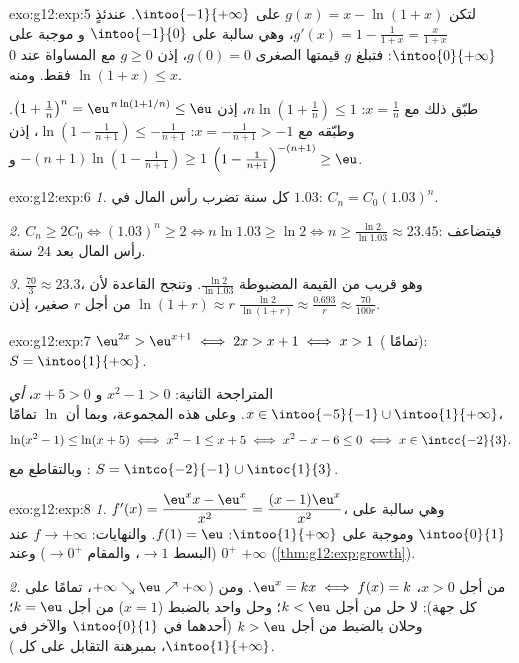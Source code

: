 \begin{solution}{exo:g12:exp:5}
لتكن $g(x) = x - \ln(1+x)$ على $\intoo{-1}{+\infty}$. عندئذٍ
$g'(x) = 1 - \frac{1}{1+x} = \frac{x}{1+x}$، وهي سالبة على $\intoo{-1}{0}$ و
موجبة على $\intoo{0}{+\infty}$: فتبلغ $g$ قيمتها الصغرى $g(0) = 0$، إذن
$g \geq 0$ مع المساواة عند $0$ فقط. ومنه $\ln(1+x) \leq x$.

طبّق ذلك مع $x = \frac1n$:
$n\ln\left(1 + \frac1n\right) \leq 1$، إذن
$\left(1+\frac1n\right)^n = \eu^{\,n\ln(1+1/n)} \leq \eu$.
وطبّقه مع $x = -\frac{1}{n+1} > -1$:
$\ln\left(1 - \frac{1}{n+1}\right) \leq -\frac{1}{n+1}$، إذن
$-(n+1)\ln\left(1 - \frac{1}{n+1}\right) \geq 1$ و
$\left(1 - \frac{1}{n+1}\right)^{-(n+1)} \geq \eu$.
\end{solution}

\begin{solution}{exo:g12:exp:6}
\emph{1.} كل سنة تضرب رأس المال في $1.03$: $C_n = C_0 (1.03)^n$.

\emph{2.} $C_n \geq 2C_0 \iff (1.03)^n \geq 2 \iff n \ln 1.03 \geq \ln 2
\iff n \geq \frac{\ln 2}{\ln 1.03} \approx 23.45$: فيتضاعف رأس المال بعد
$24$ سنة.

\emph{3.} $\frac{70}{3} \approx 23.3$، وهو قريب من القيمة المضبوطة
$\frac{\ln 2}{\ln 1.03}$. وتنجح القاعدة لأن
$\ln(1 + r) \approx r$ من أجل $r$ صغير، إذن
$\frac{\ln 2}{\ln(1+r)} \approx \frac{0.693}{r} \approx \frac{70}{100r}$.
\end{solution}

\begin{solution}{exo:g12:exp:7}
$\eu^{2x} > \eu^{x+1} \iff 2x > x + 1 \iff x > 1$ (
 تمامًا): $S = \intoo{1}{+\infty}$.

 المتراجحة الثانية: $x^2 - 1 > 0$ و $x + 5 > 0$، \emph{أي}
$x \in \intoo{-5}{-1} \cup \intoo{1}{+\infty}$. وعلى هذه المجموعة، وبما أن $\ln$
 تمامًا،
\[
\ln(x^2-1) \leq \ln(x+5) \iff x^2 - 1 \leq x + 5 \iff x^2 - x - 6 \leq 0
\iff x \in \intcc{-2}{3}.
\]
وبالتقاطع مع : $S = \intco{-2}{-1} \cup \intoc{1}{3}$.
\end{solution}

\begin{solution}{exo:g12:exp:8}
\emph{1.} $f'(x) = \dfrac{\eu^x x - \eu^x}{x^2} = \dfrac{(x-1)\eu^x}{x^2}$،
وهي سالبة على $\intoo{0}{1}$ وموجبة على $\intoo{1}{+\infty}$: 
$f(1) = \eu$. والنهايات: $f \to +\infty$ عند $0^+$ (البسط $\to 1$،
والمقام $\to 0^+$) وعند $+\infty$ (\cref{thm:g12:exp:growth}).

\emph{2.} من أجل $x > 0$، $\eu^x = kx \iff f(x) = k$. ومن 
($+\infty \searrow \eu \nearrow +\infty$،   تمامًا
على كل جهة): لا حل من أجل $k < \eu$؛ وحل واحد بالضبط ($x = 1$) من أجل
$k = \eu$؛ وحلان بالضبط من أجل $k > \eu$ (أحدهما في $\intoo{0}{1}$ والآخر في
$\intoo{1}{+\infty}$، بمبرهنة التقابل على كل ).
\end{solution}

